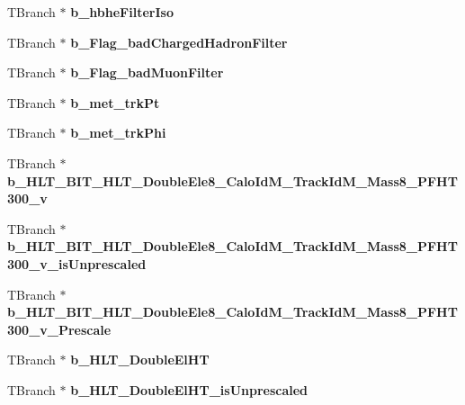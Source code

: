 \begin{DoxyCompactItemize}
\hypertarget{classMiniTree_a447705b66bf51dfc284eb783f6bce091}{}\label{classMiniTree_a447705b66bf51dfc284eb783f6bce091} 
T\+Branch $\ast$ {\bfseries b\+\_\+hbhe\+Filter\+Iso}
\item 
\hypertarget{classMiniTree_a9a3ae8e719be578e79ebb358e87d63a9}{}\label{classMiniTree_a9a3ae8e719be578e79ebb358e87d63a9} 
T\+Branch $\ast$ {\bfseries b\+\_\+\+Flag\+\_\+bad\+Charged\+Hadron\+Filter}
\item 
\hypertarget{classMiniTree_a1f91a8514ce7a53b0c06b1824e625324}{}\label{classMiniTree_a1f91a8514ce7a53b0c06b1824e625324} 
T\+Branch $\ast$ {\bfseries b\+\_\+\+Flag\+\_\+bad\+Muon\+Filter}
\item 
\hypertarget{classMiniTree_a384e784eac292637ff420051eaa59ce9}{}\label{classMiniTree_a384e784eac292637ff420051eaa59ce9} 
T\+Branch $\ast$ {\bfseries b\+\_\+met\+\_\+trk\+Pt}
\item 
\hypertarget{classMiniTree_a9823ed202232ac1e871cd3787a8b4f44}{}\label{classMiniTree_a9823ed202232ac1e871cd3787a8b4f44} 
T\+Branch $\ast$ {\bfseries b\+\_\+met\+\_\+trk\+Phi}
\item 
\hypertarget{classMiniTree_a2944d239f60fb04ab68e64ae00c6227e}{}\label{classMiniTree_a2944d239f60fb04ab68e64ae00c6227e} 
T\+Branch $\ast$ {\bfseries b\+\_\+\+H\+L\+T\+\_\+\+B\+I\+T\+\_\+\+H\+L\+T\+\_\+\+Double\+Ele8\+\_\+\+Calo\+Id\+M\+\_\+\+Track\+Id\+M\+\_\+\+Mass8\+\_\+\+P\+F\+H\+T300\+\_\+v}
\item 
\hypertarget{classMiniTree_a80844860ab4880bc7ceb6e7217566fb7}{}\label{classMiniTree_a80844860ab4880bc7ceb6e7217566fb7} 
T\+Branch $\ast$ {\bfseries b\+\_\+\+H\+L\+T\+\_\+\+B\+I\+T\+\_\+\+H\+L\+T\+\_\+\+Double\+Ele8\+\_\+\+Calo\+Id\+M\+\_\+\+Track\+Id\+M\+\_\+\+Mass8\+\_\+\+P\+F\+H\+T300\+\_\+v\+\_\+is\+Unprescaled}
\item 
\hypertarget{classMiniTree_a7182c999aacb1b7314c7f0dbc64ba64b}{}\label{classMiniTree_a7182c999aacb1b7314c7f0dbc64ba64b} 
T\+Branch $\ast$ {\bfseries b\+\_\+\+H\+L\+T\+\_\+\+B\+I\+T\+\_\+\+H\+L\+T\+\_\+\+Double\+Ele8\+\_\+\+Calo\+Id\+M\+\_\+\+Track\+Id\+M\+\_\+\+Mass8\+\_\+\+P\+F\+H\+T300\+\_\+v\+\_\+\+Prescale}
\item 
\hypertarget{classMiniTree_a0b3e783c6f08d4b5279d9543e7cc8346}{}\label{classMiniTree_a0b3e783c6f08d4b5279d9543e7cc8346} 
T\+Branch $\ast$ {\bfseries b\+\_\+\+H\+L\+T\+\_\+\+Double\+El\+HT}
\item 
\hypertarget{classMiniTree_ab48cda9b2c403a97900d7afa53b0eacf}{}\label{classMiniTree_ab48cda9b2c403a97900d7afa53b0eacf} 
T\+Branch $\ast$ {\bfseries b\+\_\+\+H\+L\+T\+\_\+\+Double\+El\+H\+T\+\_\+is\+Unprescaled}

\end{DoxyCompactItemize}
